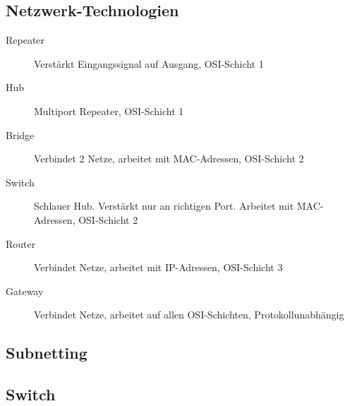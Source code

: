 \documentclass[12pt,a4paper]{article}
\begin{document}
		\subsection{Netzwerk-Technologien}
			\begin{description}
				\item[Repeater] Verstärkt Eingangssignal auf Ausgang, OSI-Schicht 1
				\item[Hub] Multiport Repeater, OSI-Schicht 1
				\item[Bridge] Verbindet 2 Netze, arbeitet mit MAC-Adressen, OSI-Schicht 2 
				\item[Switch] Schlauer Hub. Verstärkt nur an richtigen Port. Arbeitet mit MAC-Adressen, OSI-Schicht 2 
				\item[Router] Verbindet Netze, arbeitet mit IP-Adressen, OSI-Schicht 3
				\item[Gateway] Verbindet Netze, arbeitet auf allen OSI-Schichten, Protokollunabhängig 
			\end{description}

		\subsection{Subnetting}

		\subsection{Switch}
\end{document}
